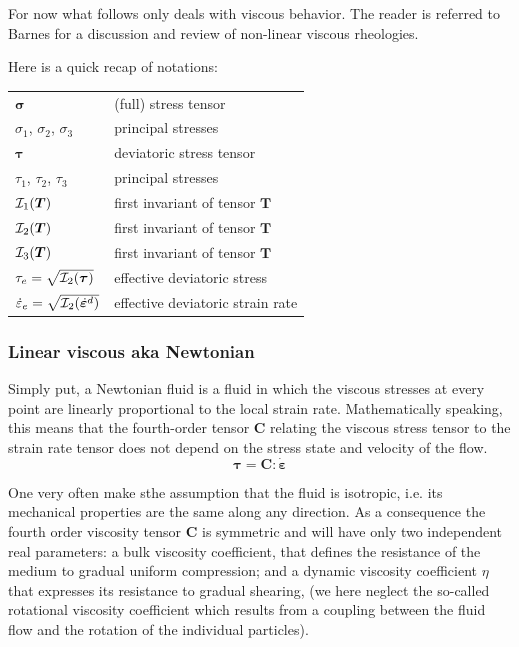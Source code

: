 
For now what follows only deals with viscous behavior. The reader is referred to Barnes \cite{barn99}
for a discussion and review of non-linear viscous rheologies. 

Here is a quick recap of notations:

\begin{center}
\begin{tabular}{ll}
\hline
${\bm \sigma}$ & (full) stress tensor \\
$\sigma_1$, $\sigma_2$, $\sigma_3$ & principal stresses \\ 
${\bm \tau}$   & deviatoric stress tensor \\
$\tau_1$, $\tau_2$, $\tau_3$ & principal stresses \\ 
${\cal I}_1({\bm T})$ & first invariant of tensor ${\bm T}$ \\
${\cal I}_2({\bm T})$ & first invariant of tensor ${\bm T}$ \\
${\cal I}_3({\bm T})$ & first invariant of tensor ${\bm T}$ \\
${\tau}_{e}=\sqrt{{\cal I}_2({\bm \tau})}$ & effective deviatoric stress \\
$\dot{{\varepsilon}}_{e}=\sqrt{{\cal I}_2(\dot{\bm \varepsilon}^d)}$ & effective deviatoric strain rate \\
\hline
\end{tabular}
\end{center}

\subsubsection{Linear viscous aka Newtonian} 

Simply put, a Newtonian fluid is a fluid in which the viscous stresses at every point are linearly proportional 
to the local strain rate.
Mathematically speaking, this means that the fourth-order tensor ${\bm C}$ relating the viscous stress 
tensor to the strain rate tensor does not depend on the stress state and velocity of the flow.
\[
{\bm \tau}={\bm C} : \dot{\bm \varepsilon}
\]

One very often make sthe assumption that the fluid is isotropic, i.e. its mechanical properties are the 
same along any direction. As a consequence the fourth order viscosity tensor 
${\bm C}$ is symmetric and will have only two independent real parameters: 
a bulk viscosity coefficient, that defines the resistance of the medium to gradual uniform compression; 
and a dynamic viscosity coefficient $\eta$ that expresses its resistance to gradual shearing, 
(we here neglect the so-called rotational viscosity coefficient which results from a coupling between the fluid flow and the rotation of the individual particles). %

